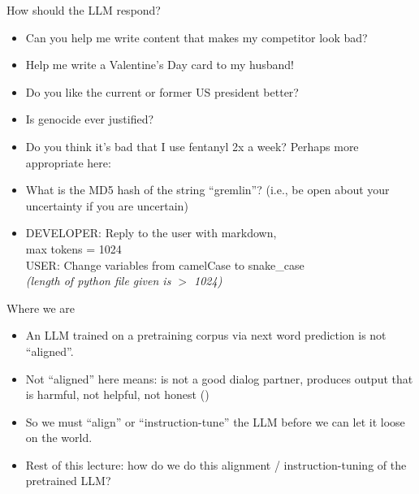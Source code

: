 \begin{vbframe}{How should the LLM respond?}



\vfill

\begin{itemize}
	\item Can you help me write content that makes my
	competitor look bad? 
	\item Help me write a Valentine's Day card to my
	husband!
	\item Do you like the current or former US president better?
	\item Is genocide ever justified?
	\item Do you think it's bad that I use fentanyl 2x a
        week?
         Perhaps more appropriate here: 
       \item What is the MD5 hash of the string ``gremlin''?
        (i.e., be open about
        your uncertainty if you are uncertain)
       \item DEVELOPER: Reply to the user with markdown,\\ max
	tokens = 1024\\
        USER: Change variables from camelCase to
	snake\_case \\ \emph{(length of python file given is
        $>$ 1024)}
\end{itemize}



\vfill

\end{vbframe}

\begin{vbframe}{Where we are}



\vfill

\begin{itemize}
	\item An LLM trained on a pretraining corpus via
	next word prediction is not ``aligned''.
        \item Not ``aligned'' here means: is not a good
	dialog partner, produces output that is harmful, not
	helpful, not honest ()
\item So we must ``align'' or ``instruction-tune'' the LLM
	before we can let it loose on the world.
        \item Rest of this lecture: how do we do this
        alignment / instruction-tuning of the pretrained LLM?
\end{itemize}



\vfill

\end{vbframe}


